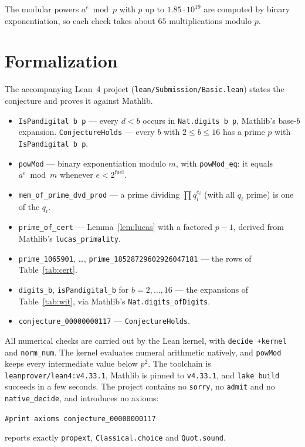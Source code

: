 \documentclass[11pt]{article}
\theoremstyle{plain}
\theoremstyle{definition}
\theoremstyle{remark}
\begin{document}
The modular powers $a^{e}\bmod p$ with $p$ up to $1.85\cdot10^{19}$ are
computed by binary exponentiation, so each check takes about $65$
multiplications modulo $p$.

\section{Formalization}

The accompanying Lean~4 project (\texttt{lean/Submission/Basic.lean}) states
the conjecture and proves it against Mathlib.

\begin{itemize}
  \item \texttt{IsPandigital b p} --- every $d<b$ occurs in
    \texttt{Nat.digits b p}, Mathlib's base-$b$ expansion.
    \texttt{ConjectureHolds} --- every $b$ with $2\le b\le16$ has a prime
    $p$ with \texttt{IsPandigital b p}.
  \item \texttt{powMod} --- binary exponentiation modulo $m$, with
    \texttt{powMod\_eq}: it equals $a^e\bmod m$ whenever $e<2^{\mathrm{fuel}}$.
  \item \texttt{mem\_of\_prime\_dvd\_prod} --- a prime dividing
    $\prod q_i^{e_i}$ (with all $q_i$ prime) is one of the $q_i$.
  \item \texttt{prime\_of\_cert} --- Lemma~\ref{lem:lucas} with a factored
    $p-1$, derived from Mathlib's \texttt{lucas\_primality}.
  \item \texttt{prime\_1065901}, \ldots, \texttt{prime\_18528729602926047181}
    --- the rows of Table~\ref{tab:cert}.
  \item \texttt{digits\_b}, \texttt{isPandigital\_b} for $b=2,\ldots,16$ ---
    the expansions of Table~\ref{tab:wit}, via Mathlib's
    \texttt{Nat.digits\_ofDigits}.
  \item \texttt{conjecture\_00000000117} --- \texttt{ConjectureHolds}.
\end{itemize}

All numerical checks are carried out by the Lean kernel, with
\texttt{decide +kernel} and \texttt{norm\_num}. The kernel evaluates numeral
arithmetic natively, and \texttt{powMod} keeps every intermediate value below
$p^2$. The toolchain is \texttt{leanprover/lean4:v4.33.1}, Mathlib is pinned to
\texttt{v4.33.1}, and \texttt{lake build} succeeds in a few seconds. The
project contains no \texttt{sorry}, no \texttt{admit} and no
\texttt{native\_decide}, and introduces no axioms:
\begin{center}
\texttt{\#print axioms conjecture\_00000000117}
\end{center}
reports exactly \texttt{propext}, \texttt{Classical.choice} and
\texttt{Quot.sound}.
\end{document}
